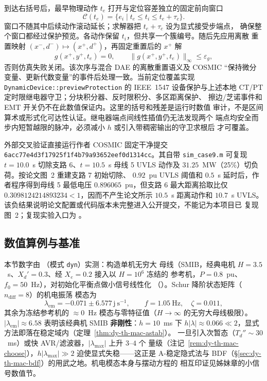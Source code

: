 到达右括号后，最早物理动作 $t_e$ 打开与定位容差独立的固定前向窗口
\begin{equation}
 \mathcal C(t_e)=\{e_i\mid t_e\le t_i\le t_e+\tau_c\}.
 \label{eq:dy-th-mac-event-cluster}
\end{equation}
窗口不随其中后续动作滚动延长；求解器把 $t_e+\tau_c$ 设为显式接受步端点，
确保整个窗口都经过保护预览。各动作保留 $t_i$，但共享一个簇编号。随后先应用离散
重置映射 $(x^-,d^-)\mapsto(x^+,d^+)$，再固定重置后的 $x^+$ 解
\begin{equation}
 g(x^+,y^+,t_e)=0,
 \qquad \lVert g(x^+,y^+,t_e)\rVert_\infty\le\varepsilon_g,
 \label{eq:dy-th-mac-event-reinit}
\end{equation}
否则仿真失败关闭。该次序与混合 DAE 的离散重置语义\cite{dym:hiskens-pai}及
COSMIC ``保持微分变量、更新代数变量''的事件后处理一致。当前定位覆盖实现
\texttt{DynamicDevice::previewProtection} 的 IEEE~1547 设备保护与上述本地
CT/PT 定时限继电器守卫；分块积分器、反时限积分、多区距离保护、
擦边/芝诺事件和 EMT 开关仍不在此数值保证内。这里的括号和残差是运行时数值
审计，不是区间算术或形式化可达性认证。继电器端点间线性插值仍无法发现两个
端点均安全而步内短暂越限的脉冲，必须减小 $h$ 或引入带稠密输出的守卫求根后
才可覆盖。

外部交叉验证直接运行作者 COSMIC 固定干净提交
\texttt{6acc77e4d3f17925f1f4b79a93652eef0d1314cc}。其自带
\texttt{sim\_case9.m} 可复现 $t=10.0$~s 切除支路 6、$t=10.5$~s 母线 5
UVLS 动作及 $31.25$~MW（25\%）切负荷。按论文图~2 重建支路 7 初始切除、
$0.92$~pu UVLS 阈值和 $0.5$~s 延时后，作者程序得到母线 5 最低电压
$0.896065$~pu，但支路 6 最大距离拾取比仅
$0.3098124214893234<1$，因而不产生论文所示 $10.5$~s 距离动作和 $10.7$~s
UVLS。该负结果说明论文配置或代码版本未完整进入公开提交，不能记为本项目已
复现图~2；复现实验入口为
。

\subsection{数值算例与基准}\label{sec:dy-th-mac-numexp}

本节数字由 （模式 \texttt{dyn}）实测：构造单机无穷大
母线（SMIB，经典电机 $H{=}3.5$~s、$X_d'{=}0.3$、经 $X_e{=}0.2$ 接入以 $H{=}10^6$ 冻结的
参考机，$P{=}0.8$~pu、$f_0{=}50$~Hz），对初始化平衡点做小信号线性化
（）。Schur 降阶状态矩阵（$n_{\mathrm{diff}}{=}8$）的机电振荡
模态为
\begin{equation}
\lambda_{\mathrm{em}}=-0.071\pm6.577\,\mathrm j~\mathrm{s^{-1}},\qquad
f=1.05~\mathrm{Hz},\quad\zeta=0.011,
\end{equation}
其余为冻结参考机的 $\approx0$~Hz 模态与零特征值（$H\to\infty$ 的无穷大母线极限）。
$|\lambda_{\mathrm{em}}|\approx6.58$ 表明该经典机 SMIB \textbf{非刚性}：$h{=}10$~ms 下
$h|\lambda|\approx0.066\ll2$，显式方法即落在稳定域内（定理~\ref{thm:dy-th-mac-astab}）。
一旦引入次暂态（$T_d''\sim30$~ms）或快 AVR/滤波器，$|\lambda_{\max}|$ 上升 $3$--$4$ 个
量级（注记~\ref{rem:dy-th-mac-choose}），$h|\lambda_{\max}|\gg2$ 迫使显式失稳——这正是
A-稳定隐式法与 BDF（§\ref{sec:dy-th-mac-bdf}）的用武之地。机电模态本身与摆动方程的
相互印证见姊妹章的小信号数值节。

